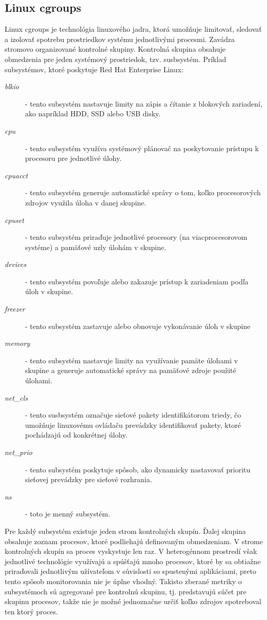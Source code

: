 \documentclass[printed,11pt,twoside,color,cover,table]{fithesis3}
\begin{document}
\subsection{Linux cgroups}
Linux cgroups je technológia linuxového jadra, ktorá umožňuje limitovať, sledovať a izolovať spotrebu prostriedkov systému jednotlivými procesmi. Zavádza stromovo organizované kontrolné skupiny. 
Kontrolná skupina obsahuje obmedzenia pre jeden systémový prostriedok, tzv. susbsystém. Príklad subsystémov, ktoré poskytuje Red Hat Enterprise Linux: 
\begin{description}
\item[\emph{blkio}] - tento subsystém nastavuje limity na zápis a čítanie z blokových zariadení, ako napríklad HDD, SSD alebo USB disky.
\item[\emph{cpu}] - tento subsystém využíva systémový plánovač na poskytovanie prístupu k procesoru pre jednotlivé úlohy.
\item[\emph{cpuacct}] - tento subsystém generuje automatické správy o tom, koľko procesorových zdrojov využila úloha v danej skupine.
\item[\emph{cpuset}] - tento subsystém priraďuje jednotlivé procesory (na viacprocesorovom systéme) a pamäťové uzly úlohám v skupine.
\item[\emph{devices}] - tento subsystém povoľuje alebo zakazuje prístup k zariadeniam podľa úloh v skupine.
\item[\emph{freezer}] - tento subsystém zastavuje alebo obnovuje vykonávanie úloh v skupine
\item[\emph{memory}] - tento subsystém nastavuje limity na využívanie pamäte úlohami v skupine a generuje automatické správy na pamäťové zdroje použité úlohami.
\item[\emph{net\_cls}] - tento susbsystém označuje sieťové pakety identifikátorom triedy, čo umožňuje linuxovému ovládaču prevádzky identifikovať pakety, ktoré pochádzajú od konkrétnej úlohy.
\item[\emph{net\_prio}] - tento subsystém poskytuje spôsob, ako dynamicky nastavovať prioritu sieťovej prevádzky pre sieťové rozhrania.
\item[\emph{ns}] - toto je menný subsystém.
\end{description}
\cite{cgroups}

Pre každý subsystém existuje jeden strom kontrolných skupín. Ďalej skupina obsahuje zoznam procesov, ktoré podliehajú definovaným obmedzeniam. V strome kontrolných skupín sa proces vyskystuje len raz.
V heterogénnom prostredí však jednotlivé technológie využívajú a spúšťajú mnoho procesov, ktoré by sa obtiažne priraďovali jednotlivým užívateľom v súvislosti so spustenými aplikáciami, preto tento spôsob
monitorovania nie je úplne vhodný. Takisto zberané metriky o subsystémoch sú agregované pre kontrolnú skupinu, tj. predstavujú súčet pre skupinu procesov, takže nie je možné jednoznačne určiť koľko zdrojov 
spotreboval ten ktorý proces.
\end{document}
